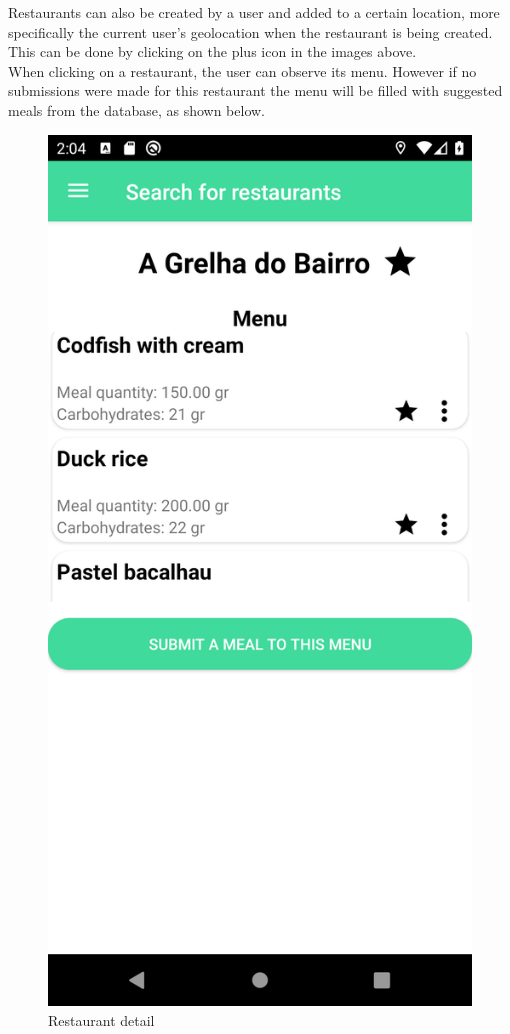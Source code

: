 Restaurants can also be created by a user and added to a certain location, more specifically the current user's geolocation when 
the restaurant is being created. This can be done by clicking on the plus icon in the images above.\\

When clicking on a restaurant, the user can observe its menu. However if no submissions were made for this restaurant the menu will
be filled with suggested meals from the database, as shown below.\\

\begin{figure}[H]
    \begin{center}
        \includegraphics[scale=0.1]{_figures/restaurant_detail.png}
        \caption{Restaurant detail} 
    \end{center}
\end{figure}

